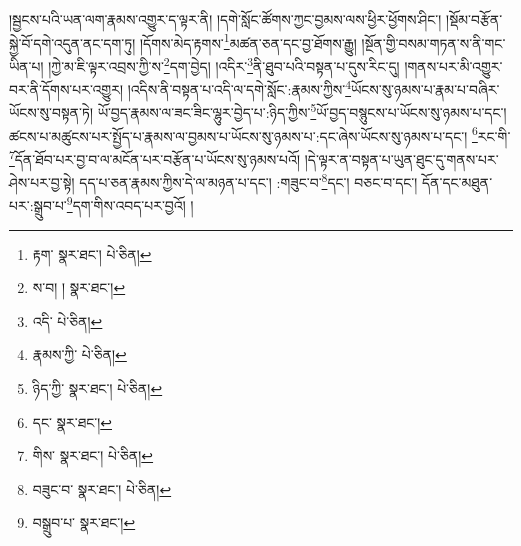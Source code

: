 །སྦྱངས་པའི་ཡན་ལག་རྣམས་འགྱུར་ད་ལྟར་ནི། །དགེ་སློང་ཚོགས་ཀྱང་བྱམས་ལས་ཕྱིར་ཕྱོགས་ཤིང་། །སྡོམ་བརྩོན་སྐྱེ་བོ་དགེ་འདུན་ནང་དག་ཏུ། །དོགས་མེད་རྟགས་\footnote{རྟག་  སྣར་ཐང་།  པེ་ཅིན། }མཚན་ཅན་དང་བྱ་ཐོགས་རྒྱུ། །སྔོན་གྱི་བསམ་གཏན་ས་ནི་གང་ཡིན་པ། །ཀྱེ་མ་ཇི་ལྟར་འབྲས་ཀྱི་ས་\footnote{ས་བ། །  སྣར་ཐང་། }དག་བྱེད། །འདིར་\footnote{འདི་  པེ་ཅིན། }ནི་ཐུབ་པའི་བསྟན་པ་དུས་རིང་དུ། །གནས་པར་མི་འགྱུར་བར་ནི་དོགས་པར་འགྱུར། །འདིས་ནི་བསྟན་པ་འདི་ལ་དགེ་སློང་:རྣམས་ཀྱིས་\footnote{རྣམས་ཀྱི་  པེ་ཅིན། }ཡོངས་སུ་ཉམས་པ་རྣམ་པ་བཞིར་ཡོངས་སུ་བསྟན་ཏེ། ཡོ་བྱད་རྣམས་ལ་ཟང་ཟིང་ལྷུར་བྱེད་པ་:ཉིད་ཀྱིས་\footnote{ཉིད་ཀྱི་  སྣར་ཐང་།  པེ་ཅིན། }ཡོ་བྱད་བསྙུངས་པ་ཡོངས་སུ་ཉམས་པ་དང་། ཚངས་པ་མཚུངས་པར་སྤྱོད་པ་རྣམས་ལ་བྱམས་པ་ཡོངས་སུ་ཉམས་པ་:དང་ཞེས་ཡོངས་སུ་ཉམས་པ་དང་། \footnote{དང་  སྣར་ཐང་། }རང་གི་\footnote{གིས་  སྣར་ཐང་།  པེ་ཅིན། }དོན་ཐོབ་པར་བྱ་བ་ལ་མངོན་པར་བརྩོན་པ་ཡོངས་སུ་ཉམས་པའོ། །དེ་ལྟར་ན་བསྟན་པ་ཡུན་ཐུང་དུ་གནས་པར་ཤེས་པར་བྱ་སྟེ། དད་པ་ཅན་རྣམས་ཀྱིས་དེ་ལ་མཉན་པ་དང་། :གཟུང་བ་\footnote{བཟུང་བ་  སྣར་ཐང་།  པེ་ཅིན། }དང་། བཅང་བ་དང་། དོན་དང་མཐུན་པར་:སྒྲུབ་པ་\footnote{བསྒྲུབ་པ་  སྣར་ཐང་། }དག་གིས་འབད་པར་བྱའོ། །

